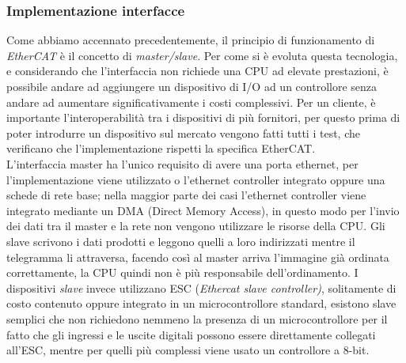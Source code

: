 \subsubsection{Implementazione interfacce}
Come abbiamo accennato precedentemente, il principio di funzionamento di \textit{EtherCAT} è il concetto di \textit{master/slave}. Per come si è evoluta questa tecnologia, e considerando che l'interfaccia non richiede una CPU ad elevate prestazioni, è possibile andare ad aggiungere un dispositivo di I/O ad un controllore senza andare ad aumentare significativamente i costi complessivi. Per un cliente, è importante l'interoperabilità tra i dispositivi di più fornitori, per questo prima di poter introdurre un dispositivo sul mercato vengono fatti tutti i test, che verificano che l'implementazione rispetti la specifica EtherCAT.\\ L'interfaccia master ha l'unico requisito di avere una porta ethernet, per l'implementazione viene utilizzato o l'ethernet controller integrato oppure una schede di rete base; nella maggior parte dei casi l'ethernet controller viene integrato mediante un DMA (Direct Memory Access), in questo modo per l'invio dei dati tra il master e la rete non vengono utilizzare le risorse della CPU. Gli slave scrivono i dati prodotti e leggono quelli a loro indirizzati mentre il telegramma li attraversa, facendo così al master arriva l'immagine già ordinata correttamente, la CPU quindi non è più responsabile dell'ordinamento. I dispositivi \textit{slave} invece utilizzano ESC (\textit{Ethercat slave controller)}, solitamente di costo contenuto oppure integrato in un microcontrollore standard, esistono slave semplici che non richiedono nemmeno la presenza di un microcontrollore per il fatto che gli ingressi e le uscite digitali possono essere direttamente collegati all'ESC, mentre per quelli più complessi viene usato un controllore a 8-bit.
